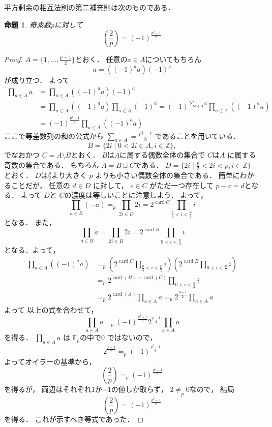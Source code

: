 \documentclass[leqno, 12pt]{jsarticle}
\newtheorem{prop}[thm]{命題}
\newcommand{\zz}{\mathbb{Z}}
\newcommand{\ff}{\mathbb{F}}
\newcommand{\leg}[2]{\left(\frac{#1}{#2}\right)}
\DeclareMathOperator{\card}{card}
\begin{document}
平方剰余の相互法則の第二補充則は次のものである．
\begin{prop}
奇素数$p$に対して
\[
\leg{2}{p}=(-1)^{\frac{p^2-1}{8}}
\]
\end{prop}
\begin{proof}
$A= \{1, \dots, \frac{p-1}{2}\}$とおく．
任意の$a\in A$についてもちろん
\[
a=((-1)^{a}a)(-1)^a
\]
が成り立つ．
よって
\begin{align*}
\prod_{a\in A}a&=\prod_{a\in A}((-1)^aa)(-1)^a\\
&=\prod_{a\in A}((-1)^aa)\prod_{a\in A}(-1)^a=(-1)^{\sum_{a\in A}a}\prod_{a\in A}((-1)^aa)\\
&=(-1)^{\frac{p^2-1}{8}}\prod_{a\in A}((-1)^aa)
\end{align*}
ここで等差数列の和の公式から
$\sum_{a\in A}=\frac{p^2-1}{8}$
であることを用いている．
\[
B=\{2i\mid 0<2i\in A, i\in \zz\}, 
\]
でなおかつ
 $C=A\setminus B$とおく．
 $B$は$A$に属する偶数全体の集合で
 $C$は$A$
 に属する奇数の集合である．
 もちろん
 $A=B\sqcup C$である．
$D=\{2i\mid \frac{p}{2}<2i<p, i\in \zz\}$
とおく．
$D$は$\frac{p}{2}$より大きく
$p$
よりも小さい偶数全体の集合である．
簡単にわかることだが，
任意の
$d\in D$
に対して，
$c\in C$
がただ一つ存在して
$p-c=d$となる．
よって
$D$と
$C$の濃度は等しいことに注意しよう．
よって，
\[
\prod_{a\in B}(-a)=_p \prod_{2i\in D}2i=2^{\card{C}}\prod_{\frac{p}{4}<i<\frac{p}{2}}i
\]
となる．
また，
\[
\prod_{a\in B}a=\prod_{2i\in B}2i=2^{\card{B}}\prod_{0<i<\frac{p}{4}}i
\]
となる．よって，
\begin{align*}
\prod_{a\in A}((-1)^aa)&=_p\left(2^{\card{C}}\prod_{\frac{p}{4}<i<\frac{p}{2}}i\right)
\left(2^{\card{B}}\prod_{0<i<\frac{p}{4}}i\right)\\
&=_p 2^{\card(B)+\card(C)}\prod_{0<i<\frac{p}{2}}i\\
&=_p 2^{\card(A)}\prod_{a\in A}a=_p2^{\frac{p-1}{2}}\prod_{a\in A}a
\end{align*}
よって
以上の式を合わせて，
\[
\prod_{a\in A}a=_p(-1)^{\frac{p^2-1}{8}}2^{\frac{p-1}{2}}\prod_{a\in A}a
\]
を得る．
$\prod_{a\in A}a$
は
$\ff_p$の中で$0$
ではないので，
\[
2^{\frac{p-1}{2}}=_p(-1)^{\frac{p^2-1}{8}}
\]
よってオイラーの基準から，
\[
\leg{2}{p}=_p(-1)^{\frac{p^2-1}{8}}
\]
を得るが，
両辺はそれぞれ$1$か$-1$の値しか取らず，
$2\neq_p0$なので，
結局
\[
\leg{2}{p}=(-1)^{\frac{p^2-1}{8}}
\]
を得る．
これが示すべき等式であった．
\end{proof}
\end{document}
